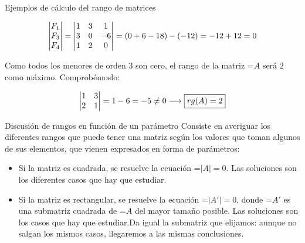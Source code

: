 \documentclass[11pt,a4paper]{article}
\newcommand{\fmm}[1]{\setbox0=\hbox{$#1$}\ifdim\wd0>\linewidth\fmdisp{#1}\else\mbox{\box0}\fi}
\newcommand{\fmdisp}[1]{\[\setbox2=\hbox{$\displaystyle #1$}\ifdim\wd2>\linewidth\resizebox{\linewidth}{!}{\box2}\else\box2\fi\]}
\begin{document}
\begin{fmex}{Ejemplos de cálculo del rango de matrices}
\begin{enumerate}[label=\textbf{\arabic*.},leftmargin=*]
\fmdisp{\begin{vmatrix}F_1\\ F_3\\ F_4\end{vmatrix}=\begin{vmatrix}1 & 3 & 1\\ 3 & 0 & -6\\ 1 & 2 & 0\end{vmatrix}=(0+6-18)-(-12)=-12+12=0}

Como todos los menores de orden 3 son cero, el rango de la matriz \fmm{A} será 2 como máximo. Comprobémoslo:

\fmdisp{\begin{vmatrix}1 & 3\\ 2 & 1\end{vmatrix}=1-6=-5\neq0\longrightarrow\boxed{rg(A)=2}}

\end{enumerate}
\end{fmex}

\begin{fmprop}{Discusión de rangos en función de un parámetro}
Consiste en averiguar los diferentes rangos que puede tener una matriz según los valores que toman algunos de sus elementos, que vienen expresados en forma de parámetros:

\begin{itemize}
\item Si la matriz es cuadrada, se resuelve la ecuación \fmm{|A|=0}. Las soluciones son los diferentes casos que hay que estudiar.
\item Si la matriz es rectangular, se resuelve la ecuación \fmm{|A'|=0}, donde \fmm{A'} es una submatriz cuadrada de \fmm{A} del mayor tamaño posible. Las soluciones son los casos que hay que estudiar.\newline Da igual la submatriz que elijamos: aunque no salgan los mismos casos, llegaremos a las mismas conclusiones.
\end{itemize}
\end{fmprop}
\end{document}
